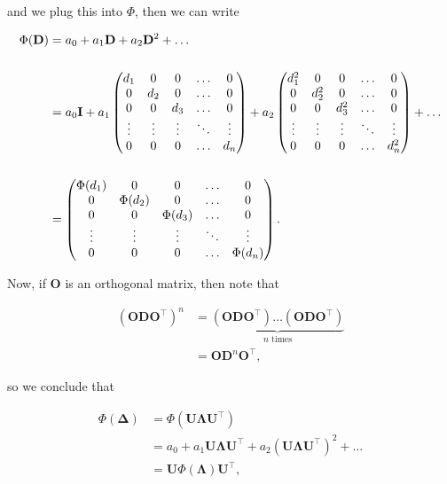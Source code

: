and we plug this into $\Phi$, then we can write

\begin{align} %
    \Phi(\mathbf D) &= a_0 + a_1 \mathbf D + a_2 \mathbf D^2 + \dots \notag \\
    \notag \\
    &= a_0 \mathbf I + a_1 
    \begin{pmatrix}
        d_1 & 0 & 0 & \ldots & 0 \\
        0 & d_2 & 0 & \ldots & 0 \\
        0 & 0 & d_3 & \ldots & 0 \\
        \vdots & \vdots & \vdots & \ddots & \vdots \\
        0 & 0 & 0 & \ldots & d_n
    \end{pmatrix}
    + a_2
    \begin{pmatrix}
        d_1^2 & 0 & 0 & \ldots & 0 \\
        0 & d_2^2 & 0 & \ldots & 0 \\
        0 & 0 & d_3^2 & \ldots & 0 \\
        \vdots & \vdots & \vdots & \ddots & \vdots \\
        0 & 0 & 0 & \ldots & d_n^2
    \end{pmatrix}
    + \dots \notag \\
    \notag \\
    &= 
    \begin{pmatrix}
        \Phi(d_1) & 0 & 0 & \ldots & 0 \\
        0 & \Phi(d_2) & 0 & \ldots & 0 \\
        0 & 0 & \Phi(d_3) & \ldots & 0 \\
        \vdots & \vdots & \vdots & \ddots & \vdots \\
        0 & 0 & 0 & \ldots & \Phi(d_n)
    \end{pmatrix} \label{eq:diag}.
\end{align}

Now, if $\mathbf O$ is an orthogonal matrix, then note that

\begin{align*}
    (\mathbf{ODO}^\intercal)^n &= \underbrace{(\mathbf{ODO}^\intercal)\dots(\mathbf{ODO}^\intercal)}_{n \text{ times}}\\
    &= \mathbf{O}\mathbf D^n \mathbf{O}^\intercal,
\end{align*}

so we conclude that

\begin{align*}
    \Phi(\mathbf \Delta) &= \Phi(\mathbf{U \Lambda U}^\intercal) \\
    &= a_0 + a_1 \mathbf{U \Lambda U}^\intercal + a_2 (\mathbf{U \Lambda U}^\intercal)^2 + \dots\\
    &= \mathbf U \Phi(\mathbf \Lambda) \mathbf{U}^\intercal,
\end{align*}

